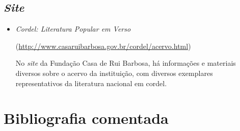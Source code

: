 \documentclass[12pt]{extarticle}
\begin{document}
\subsection{\emph{Site}}

\begin{itemize}
\item\textit{Cordel: Literatura Popular em Verso}

(\url{http://www.casaruibarbosa.gov.br/cordel/acervo.html})

No \emph{site} da Fundação Casa de Rui Barbosa, há informações e
materiais diversos sobre o acervo da instituição, com diversos
exemplares representativos da literatura nacional em cordel.
\end{itemize}

\section{Bibliografia comentada}
\end{document}
